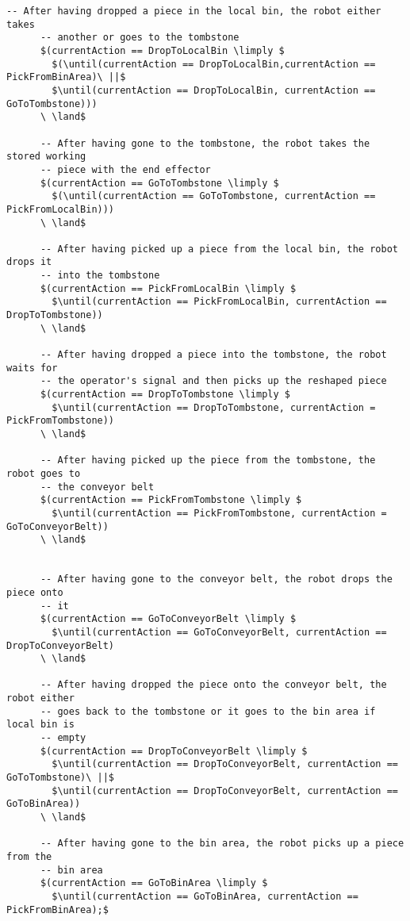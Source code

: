 \begin{lstlisting}[fontadjust, mathescape, frame=single]
      -- After having dropped a piece in the local bin, the robot either takes 
      -- another or goes to the tombstone
      $(currentAction == DropToLocalBin \limply $
        $(\until(currentAction == DropToLocalBin,currentAction == PickFromBinArea)\ ||$
        $\until(currentAction == DropToLocalBin, currentAction == GoToTombstone)))
      \ \land$

      -- After having gone to the tombstone, the robot takes the stored working 
      -- piece with the end effector
      $(currentAction == GoToTombstone \limply $
        $(\until(currentAction == GoToTombstone, currentAction == PickFromLocalBin)))
      \ \land$

      -- After having picked up a piece from the local bin, the robot drops it 
      -- into the tombstone
      $(currentAction == PickFromLocalBin \limply $
        $\until(currentAction == PickFromLocalBin, currentAction == DropToTombstone))
      \ \land$

      -- After having dropped a piece into the tombstone, the robot waits for  
      -- the operator's signal and then picks up the reshaped piece
      $(currentAction == DropToTombstone \limply $ 
        $\until(currentAction == DropToTombstone, currentAction = PickFromTombstone))
      \ \land$

      -- After having picked up the piece from the tombstone, the robot goes to
      -- the conveyor belt
      $(currentAction == PickFromTombstone \limply $
        $\until(currentAction == PickFromTombstone, currentAction = GoToConveyorBelt))
      \ \land$


      -- After having gone to the conveyor belt, the robot drops the piece onto
      -- it
      $(currentAction == GoToConveyorBelt \limply $
        $\until(currentAction == GoToConveyorBelt, currentAction == DropToConveyorBelt)
      \ \land$

      -- After having dropped the piece onto the conveyor belt, the robot either 
      -- goes back to the tombstone or it goes to the bin area if local bin is 
      -- empty
      $(currentAction == DropToConveyorBelt \limply $
        $\until(currentAction == DropToConveyorBelt, currentAction == GoToTombstone)\ ||$
        $\until(currentAction == DropToConveyorBelt, currentAction == GoToBinArea))
      \ \land$

      -- After having gone to the bin area, the robot picks up a piece from the 
      -- bin area
      $(currentAction == GoToBinArea \limply $
        $\until(currentAction == GoToBinArea, currentAction == PickFromBinArea);$


\end{lstlisting}
